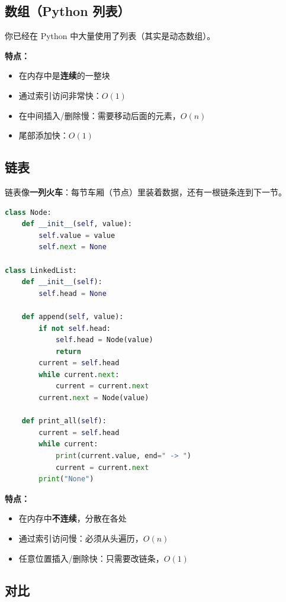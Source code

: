 \documentclass[a4paper,12pt]{ctexart}
\begin{document}
\subsection*{数组（Python 列表）}

你已经在 Python 中大量使用了列表（其实是动态数组）。

\textbf{特点：}
\begin{itemize}
  \item 在内存中是\textbf{连续}的一整块
  \item 通过索引访问非常快：$O(1)$
  \item 在中间插入/删除慢：需要移动后面的元素，$O(n)$
  \item 尾部添加快：$O(1)$
\end{itemize}

\subsection*{链表}

链表像\textbf{一列火车}：每节车厢（节点）里装着数据，还有一根链条连到下一节。

\begin{lstlisting}[language=Python]
class Node:
    def __init__(self, value):
        self.value = value
        self.next = None

class LinkedList:
    def __init__(self):
        self.head = None
    
    def append(self, value):
        if not self.head:
            self.head = Node(value)
            return
        current = self.head
        while current.next:
            current = current.next
        current.next = Node(value)
    
    def print_all(self):
        current = self.head
        while current:
            print(current.value, end=" -> ")
            current = current.next
        print("None")
\end{lstlisting}

\textbf{特点：}
\begin{itemize}
  \item 在内存中\textbf{不连续}，分散在各处
  \item 通过索引访问慢：必须从头遍历，$O(n)$
  \item 任意位置插入/删除快：只需要改链条，$O(1)$
\end{itemize}

\subsection*{对比}
\end{document}

